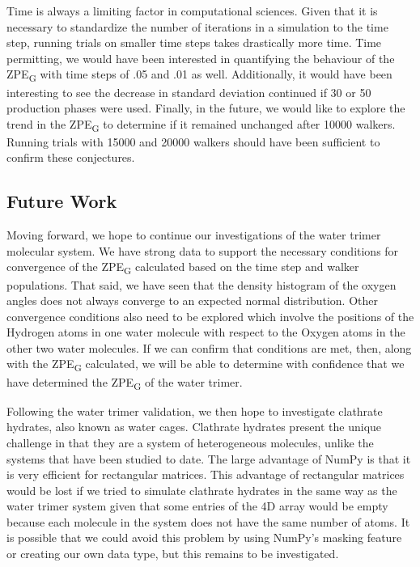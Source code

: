 \documentclass[journal=jacsat,manuscript=article]{achemso}
\begin{document}
Time is always a limiting factor in computational sciences. Given that it is necessary to standardize the number of iterations in a simulation to the time step, running trials on smaller time steps takes drastically more time. Time permitting, we would have been interested in quantifying the behaviour of the ZPE\textsubscript{G} with time steps of .05 and .01 as well. Additionally, it would have been interesting to see the decrease in standard deviation continued if 30 or 50 production phases were used. Finally, in the future, we would like to explore the trend in the ZPE\textsubscript{G} to determine if it remained unchanged after 10000 walkers. Running trials with 15000 and 20000 walkers should have been sufficient to confirm these conjectures.

\subsection{Future Work}

Moving forward, we hope to continue our investigations of the water trimer molecular system. We have strong data to support the necessary conditions for convergence of the ZPE\textsubscript{G} calculated based on the time step and walker populations. That said, we have seen that the density histogram of the oxygen angles does not always converge to an expected normal distribution. Other convergence conditions also need to be explored which involve the positions of the Hydrogen atoms in one water molecule with respect to the Oxygen atoms in the other two water molecules. If we can confirm that conditions are met, then, along with the ZPE\textsubscript{G} calculated, we will be able to determine with confidence that we have determined the ZPE\textsubscript{G} of the water trimer. 

Following the water trimer validation, we then hope to investigate clathrate hydrates\cite{Englezos1993}, also known as water cages. Clathrate hydrates present the unique challenge in that they are a system of heterogeneous molecules, unlike the systems that have been studied to date. The large advantage of NumPy is that it is very efficient for rectangular matrices. This advantage of rectangular matrices would be lost if we tried to simulate clathrate hydrates in the same way as the water trimer system given that some entries of the 4D array would be empty because each molecule in the system does not have the same number of atoms. It is possible that we could avoid this problem by using NumPy’s masking feature or creating our own data type, but this remains to be investigated. 
\end{document}
